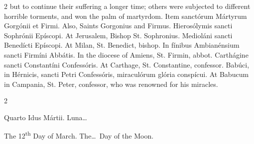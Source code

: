 \begin{paracol}{2}
 but to continue their suffering a longer time; others were subjected to 
 different horrible torments, and won the palm of martyrdom.
\switchcolumn*
{}
Item sanctórum Mártyrum Gorgónii et Firmi.
\switchcolumn
{}
Also, Saints Gorgonius and Firmus.
\switchcolumn*
{}
Hierosólymis sancti Sophrónii Epíscopi.
\switchcolumn
{}
At Jerusalem, Bishop St. Sophronius.
\switchcolumn*
{}
Medioláni sancti Benedícti Epíscopi.
\switchcolumn
{}
At Milan, St. Benedict, bishop.
\switchcolumn*
{}
In fínibus Ambianénsium sancti Firmíni Abbátis.
\switchcolumn
{}
In the diocese of Amiens, St. Firmin, abbot.
\switchcolumn*
{}
Carthágine sancti Constantíni Confessóris.
\switchcolumn
{}
At Carthage, St. Constantine, confessor.
\switchcolumn*
{}
Babúci, in Hérnicis, sancti Petri Confessóris, 
 miraculórum glória conspícui.
\switchcolumn
{}
At Babucum in Campania, St. Peter, confessor, who was renowned for his 
 miracles.
\switchcolumn*
{}
\end{paracol}


\begin{paracol}{2}
\begin{center}{\color{gregoriocolor} Quarto Idus Mártii. 
 Luna\dots\ }\end{center}
\switchcolumn
{}
\begin{center}{\color{gregoriocolor} The 12\textsuperscript{th} Day of March. 
 The\dots\ Day of the Moon.}\end{center}
\end{paracol}

